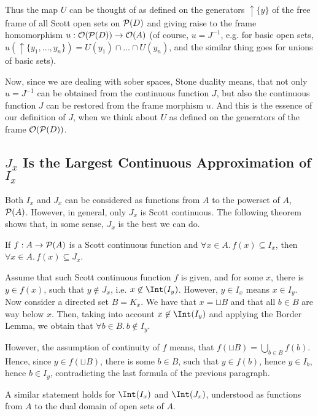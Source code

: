 Thus the map
$U$ can be thought of as defined on the generators
$\uparrow\!\!\!\{y\}$ of the
free frame of all Scott open sets on ${\cal P}(D)$
and giving raise to the frame homomorphism
$u: {\cal O}({\cal P}(D)) \to {\cal O}(A)$ (of course, $u = J^{-1}$,
e.g. for basic open sets, $u(\uparrow\!\!\!\{y_1, \ldots, y_n\}) =
U(y_1) \cap \ldots \cap U(y_n)$, and the similar thing goes
for unions of basic sets).

Now, since we are dealing with sober spaces, Stone duality means,
that not only $u=J^{-1}$ can be obtained from the continuous
function $J$, but also the continuous function $J$ can be restored
from the frame morphism $u$. And this is the essence of our
definition of $J$, when we think about $U$ as defined on the
generators of the frame ${\cal O}({\cal P}(D))$.

\subsection{$J_x$ Is the Largest Continuous Approximation of $I_x$}

Both $I_x$ and $J_x$ can be considered as functions from $A$ to the
powerset of $A$, ${\cal P}(A)$. However, in general, only $J_x$
is Scott continuous.
The following theorem shows that, in some sense, $J_x$ is the best
we can do.

\begin{theorem}
If $f: A \rightarrow {\cal P}(A)$ is a Scott continuous function
and $\forall x \in A.\,f(x) \subseteq I_x$, then
$\forall x \in A.\, f(x) \subseteq J_x$. 
\end{theorem}
\Proof
Assume that such Scott continuous function $f$ is given,
and for some $x$, there is $y \in f(x)$, such that $y \not\in J_x$,
i.e. $x \not\in \Int(I_y)$.
However, $y \in I_x$ means $x \in I_y$. Now consider a directed
set $B=K_x$. We have that $x = \sqcup B$ and that all $b \in B$
are way below $x$. Then, taking into account $x \not\in \Int(I_y)$
and applying the Border Lemma, we obtain that $\forall b \in B.\, b
\not\in I_y$.

However, the assumption of continuity of $f$ means, that
$f(\sqcup B) = \bigcup_{b \in B} f(b)$. Hence, since $y \in f(\sqcup B)$,
there is some $b \in B$, such that $y \in f(b)$, hence $y \in I_b$,
hence $b \in I_y$, contradicting the last formula of the previous
paragraph.
\eproof


A similar statement holds for $\Int(I_x)$ and $\Int(J_x)$,
understood as functions from $A$ to the dual domain of open sets
of $A$.

